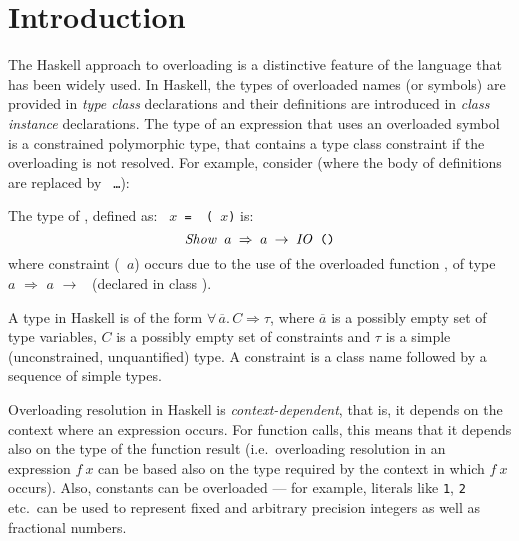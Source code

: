 \section{Introduction}
\label{sec:intro}

The Haskell approach to overloading
\cite{ghc-users-guide,MarkJones94a} is a distinctive feature of the
language that has been widely used. In Haskell, the types of
overloaded names (or symbols) are provided in {\em type class\/}
declarations and their definitions are introduced in {\em class
  instance\/} declarations. The type of an expression that uses an
overloaded symbol is a constrained polymorphic type, that contains a
type class constraint if the overloading is not resolved. For example,
consider (where the body of definitions are replaced by {\tt
  \ldots}):

The type of \print, defined as: \texttt{\print\ $x$ =
  \putStrLn\ (\sshow\ $x$)} is: \[ \texttt{{\it Show\/}\ $a$ $\Rightarrow$
  $a$ $\rightarrow$ {\it IO\/}\ ()} \] where constraint
(\texttt{\SShow\ $a$}) occurs due to the use of the overloaded
function \sshow, of type \SShow\ $a$ $\Rightarrow$ $a$ $\rightarrow$
\String\ (declared in class \SShow).

A type in Haskell is of the form $\forall\,\overline{a}.\,C
\Rightarrow \tau$, where $\overline{a}$ is a possibly empty set of
type variables, $C$ is a possibly empty set of constraints and $\tau$
is a simple (unconstrained, unquantified) type. A constraint is a
class name followed by a sequence of simple types.

Overloading resolution in Haskell is {\em context-dependent}, that is,
it depends on the context where an expression occurs. For function
calls, this means that it depends also on the type of the function
result (i.e.~overloading resolution in an expression $f\:x$ can be
based also on the type required by the context in which $f\:x$
occurs). Also, constants can be overloaded --- for example, literals
like {\tt 1}, {\tt 2} etc.~can be used to represent fixed and
arbitrary precision integers as well as fractional numbers.

